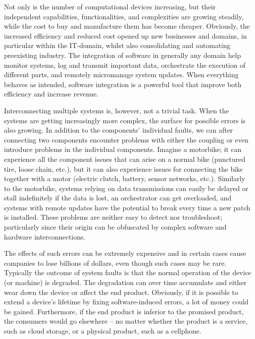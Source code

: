 Not only is the number of computational devices increasing, but their independent capabilities, functionalities, and complexities are growing steadily, while the cost to buy and manufacture them has become cheaper.
Obviously, the increased efficiency and reduced cost opened up new businesses and domains, in particular within the IT-domain, whilst also consolidating and automating preexisting industry.
The integration of software in generally any domain help monitor systems, log and transmit important data, orchestrate the execution of different parts, and remotely micromanage system updates.
When everything behaves as intended, software integration is a powerful tool that improve both efficiency and increase revenue.


Interconnecting multiple systems is, however, not a trivial task.
When the systems are getting increasingly more complex, the surface for possible errors is also growing.
In addition to the components' individual faults, we can after connecting two components encounter problems with either the coupling or even introduce problems in the individual components.
Imagine a motorbike; it can experience all the component issues that can arise on a normal bike (punctured tire, loose chain, etc.), but it can also experience issues for connecting the bike together with a motor (electric clutch, battery, sensor networks, etc.).
Similarly to the motorbike, systems relying on data transmissions can easily be delayed or stall indefinitely if the data is lost, an orchestrator can get overloaded, and systems with remote updates have the potential to break every time a new patch is installed.
These problems are neither easy to detect nor troubleshoot; particularly since their origin can be obfuscated by complex software and hardware interconnections.

The effects of such errors can be extremely expensive and in certain cases cause companies to lose billions of dollars, even though such cases may be rare.
Typically the outcome of system faults is that the normal operation of the device (or machine) is degraded.
The degradation can over time accumulate and either wear down the device or affect the end product.
Obviously, if it is possible to extend a device's lifetime by fixing software-induced errors, a lot of money could be gained.
Furthermore, if the end product is inferior to the promised product, the consumers would go elsewhere -- no matter whether the product is a service, such as cloud storage, or a physical product, such as a cellphone.

